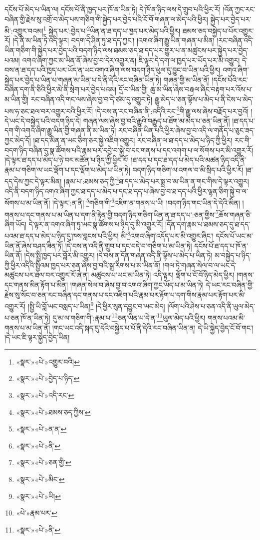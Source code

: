 དངོས་པོ་མེད་པ་ཡིན་ལ། དངོས་པོ་ནི་ཁྱད་པར་ཁོ་ན་ཡིན་ཏེ། དེ་ཁོ་ན་ཉིད་ལས་དེ་གྲུབ་པའི་ཕྱིར་རོ། །འོན་ཀྱང་རང་བཞིན་གྱི་རྗེས་སུ་འགྲོ་བ་མེད་པས་གཅིག་གི་སྐྱེད་པར་བྱེད་པའི་ངོ་བོ་གཞན་ལ་མེད་པའི་ཕྱིར། སྐྱེད་པར་བྱེད་པར་མི་:འགྱུར་བའམ།\footnote{«སྣར་»«པེ་»འགྱུར་བའི།} སྐྱེད་པར་:བྱེད་པ་\footnote{«སྣར་»«པེ་»བྱེད་པ་ཉིད་}ཡིན་ན་ཐ་དད་པ་ཁྱད་པར་མེད་པའི་ཕྱིར། ཐམས་ཅད་བསྐྱེད་པ་པོར་འགྱུར་རོ། །དེ་ནི་མ་ཡིན་ཏེ་འདི་ལྟར། བདག་དེ་ཤིན་ཏུ་ཐ་དད་ཀྱང་། །འགའ་ཞིག་རྒྱུ་ཡིན་གཞན་པ་མིན། །རང་བཞིན་འདི་ཡིན་གཅིག་གི་སྐྱེད་པར་བྱེད་པའི་བདག་ཉིད་ལས་ཐམས་ཅད་ཐ་དད་པར་གྱུར་པ་ན་མཚུངས་པར་སྐྱེད་པར་བྱེད་པའམ། འགའ་ཞིག་ཀྱང་མ་ཡིན་ནོ་ཞེས་བྱ་བ་དེར་འགྱུར་ན། ཇི་ལྟར་དེ་དག་ལ་ཁྱད་པར་ཡོད་པར་མི་འགྱུར། དེ་བས་ན་ཐ་དད་པའི་ཁྱད་པར་ཡོད་ན་ཡང་འགའ་ཞིག་ལས་བདག་ཉིད་ཕུལ་དུ་བྱུང་བ་ཡིན་པའི་ཕྱིར། འགའ་ཞིག་སྐྱེད་པར་བྱེད་པ་ཡིན་པ་གཞན་མ་ཡིན་པ་དེ་ནི་དེའི་རང་བཞིན་ཡིན་ཏེ། གཞན་གྱི་མ་ཡིན་ནོ། །དངོས་པོའི་རང་བཞིན་དག་ནི་ཅིའི་ཕྱིར་མེ་ནི་སྲེག་པར་བྱེད་པའམ། དྲོ་བ་ཡིན་གྱི། ཆུ་མ་ཡིན་ཞེས་བརྒལ་ཞིང་བརྟག་པར་འོས་པ་མ་ཡིན་གྱི། རང་བཞིན་འདི་གང་ལས་ཞེས་བྱ་བ་དེ་ཙམ་དུ་འགྱུར་ཏེ། རྒྱུ་མེད་པ་ཅན་ལྟོས་པ་མེད་པ་ནི་ངེས་པ་མེད་པས་ཧ་ཅང་ཐལ་བར་འགྱུར་བའི་ཕྱིར་རོ། །དེ་བས་ན་རང་བཞིན་ནི་:འདིའི་རང་\footnote{«སྣར་»«པེ་»འདི་རང་}གི་རྒྱུ་ལས་ཞེས་བརྗོད་པར་བྱའོ། །དེ་ཡང་དེ་བསྐྱེད་པའི་བདག་ཉིད་དེ། གཞན་ལས་ཞེས་བྱ་བའི་རྒྱུའི་བརྒྱུད་པ་ཐོག་མ་མེད་པ་ཅན་ཡིན་ནོ། །ཐ་དད་པ་དག་གི་འགའ་ཞིག་རྒྱུ་ཡིན་གྱི་གཞན་ནི་མ་ཡིན་ཏེ། རང་བཞིན་ཡིན་པའི་ཕྱིར་ཞེས་བྱ་བ་འདི་ལ་གནོད་པ་ཅུང་ཟད་ཀྱང་མེད་དོ། །ཐ་དད་མིན་ན་ཡང་ཅིག་ཅར་སྐྱེ་འཇིག་འགྱུར། རང་བཞིན་ལ་ཐ་དད་པ་མེད་པ་ཉིད་ཀྱི་ཕྱིར། རང་གི་བདག་ཉིད་བཞིན་དུ་སྣ་ཚོགས་པའི་རྣམ་པར་དབྱེ་བ་སྐྱེ་བ་དང་གནས་པ་དང་འགག་པ་ལ་སོགས་པར་མི་འགྱུར་རོ། །དེ་ལྟར་ཐ་དད་པ་མེད་པ་ཉེ་བར་མཚོན་པ་ཉིད་ཀྱི་ཕྱིར་རོ། །ཐ་དད་པ་དང་ཐ་དད་པ་མེད་པའི་མཚན་ཉིད་འདི་ནི་རྣམ་པ་གཅིག་ལ་ཡང་ལྡོག་པ་དང་ལྡོག་པ་མེད་པ་ཡིན་ཏེ། བདག་ཉིད་གཅིག་ལ་འགལ་བ་མི་སྲིད་པའི་ཕྱིར་རོ། །ཐ་དད་དེས་ཀྱང་དེ་ལྟར་མིན། །རྣམ་པ་:ཐམས་ཅད་ཀྱི་\footnote{«སྣར་»«པེ་»ཐམས་ཅད་ཀྱིས་}ཐ་དད་པ་མེད་པར་སྨྲ་བ་མ་ཡིན་ན་གང་གིས་དེ་ལྟར་འགྱུར། འདི་ནི་བདག་ཉིད་འགའ་ཞིག་ཀྱང་ཐ་དད་པ་མེད་པ་དང་ཐ་དད་པ་ཞེས་བྱ་བ་ཐ་དད་པའི་ཕྱིར་ལྷན་ཅིག་སྐྱེ་བ་ལ་སོགས་པ་མ་ཡིན་ནོ། །དེ་ལྟར་:ན་ནི། \footnote{«སྣར་»«པེ་»ན་ན་}གཅིག་གི་\footnote{«སྣར་»«པེ་»ནི་}འཇིག་ན་གནས་པ་ཡི། །བདག་ཉིད་གང་ཡིན་དེ་དེའི་མིན། །གནས་པ་དང་གནས་པ་མ་ཡིན་པ་དག་ནི་རྟེན་གྱི་བདག་ཉིད་གཅིག་ཡིན་ན་ཐ་དད་པ་:ཅན་གྱིས་\footnote{«སྣར་»«པེ་»ཅན་གྱི་}ཆོས་གཞན་ཅི་ཞིག་ཡོད། དེ་ལྟར་ན་འགའ་ཞིག་ཏུ་ཡང་སྣ་ཚོགས་པ་ཉིད་དུ་མི་འགྱུར་རོ། །དོན་དག་རྣམ་པ་ཐམས་ཅད་དུ་ཐ་དད་པའམ་ཐ་དད་པ་མེད་པ་ཉིད་དུ་ཁས་བླངས་པའི་ཕྱིར། མི་\footnote{«སྣར་»«པེ་»མིང་}འགའ་ཞིག་འདོད་པར་མི་འགྱུར་ཞིང་། དངོས་པོ་ཡང་མ་ཡིན་ནོ་ཞེས་བཤད་ཟིན་ཏོ། །དེ་བས་ན་འདི་ནི་གྲུབ་པ་དང་བདེ་བ་གཅིག་པ་མ་ཡིན་ཏེ། དངོས་པོ་ཐ་དད་པ་ཁོ་ན་ཡིན་ནོ། །དེས་སྤྱི་ཁྱད་པར་བློར་མི་འགྱུར། །དེ་བས་ན་དོན་གཞན་འདི་ནི་ལྟོས་པ་མེད་པ་ཡིན་ཏེ། མ་བསྐྱེད་པ་ཉིད་ཀྱི་ཕྱིར་འདིའི་སྤྱིའམ་ཁྱད་པར་ཅན་ཞེས་བྱ་བའི་སྒྲ་རིགས་པ་མ་ཡིན་ནོ། །གལ་ཏེ་གཞན་སེལ་བ་ལ་ཡང་དེ་མཚུངས་པར་ཐལ་བར་འགྱུར་རོ་ཞེ་ན། མཚུངས་པ་ཡང་མ་ཡིན་ཏེ། འདི་ལྟར། ལྡོག་པ་ངོ་བོ་ཉིད་མེད་ཕྱིར། །གནས་དང་གནས་མིན་རྟོག་པ་མིན། །གཞན་སེལ་བ་ཞེས་བྱ་བ་འགའ་ཞིག་ཀྱང་ཡོད་པ་མ་ཡིན་ཏེ། དེ་ཡང་རང་བཞིན་གྱི་རྗེས་སུ་སོང་བ་ཅན་རང་བཞིན་དང་གནས་པ་དང་འཇིག་པའི་རྣམ་པར་རྟོག་པ་དག་གིས་རྣམ་པར་རྟོག་པར་མི་འགྱུར་རོ། །སྤྱི་ཡི་བློ་ཡང་བསླད་པ་ཡིན།\footnote{«སྣར་»«པེ་»ཡི།} །དེ་ཕྱིར་སུན་དབྱུང་བ་ཡང་མེད། །ལོག་པའི་ཤེས་པ་ཅན་འདི་ནི་ཡུལ་མེད་པ་ཅན་ཁོ་ན་ཡིན་ཏེ། དུ་མ་ལ་གཅིག་གི་:རྣམ་པ་\footnote{«པེ་»རྣམ་པར་}ཅན་ཡིན་པ་དེ་ན་\footnote{«སྣར་»«པེ་»ནི་}ཡུལ་མེད་པའི་ཕྱིར། གནས་པའམ་མི་གནས་པ་མ་ཡིན་ནོ། །གང་ཡང་འདི་སྐད་དུ་དེའི་བསྐྱེད་པ་པོ་ནི་དེའི་རང་བཞིན་ཡིན་ན། དེ་ཡི་སྐྱེད་བྱེད་ངོ་བོ་གང་། །དེ་ཡང་ཇི་ལྟར་སྐྱེད་བྱེད་ཡིན། 